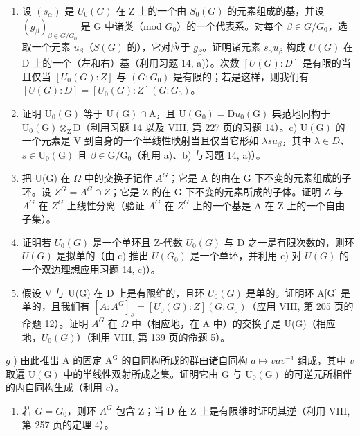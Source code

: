 \begin{enumerate}
\def\labelenumi{\alph{enumi})}
\item
  设 \((s_{\alpha})\) 是 \(U_{0}(G)\) 在 Z 上的一个由 \(S_{0}(G)\) 的元素组成的基，并设 \((g_{\beta})_{\beta\in G/G_{0}}\) 是 G 中诸类（mod \(G_{0}\)）的一个代表系。对每个 \(\beta\in G/G_{0}\)，选取一个元素 \(u_{\beta}\)（\(S(G)\) 的），它对应于 \(g_{\beta}\)。证明诸元素 \(s_{\alpha}u_{\beta}\) 构成 \(U(G)\) 在 D 上的一个（左和右）基（利用习题 14, a)）。次数 \([U(G):D]\) 是有限的当且仅当 \([U_{0}(G):Z]\) 与 \((G:G_{0})\) 是有限的；若是这样，则我们有 \([U(G):D]=[U_{0}(G):Z](G:G_{0})\)。
\item
  证明 \(\mathrm{U}_{0}(\mathrm{G})\) 等于 \(\mathrm{U}(\mathrm{G})\cap\mathrm{A}\)，且 \(\mathrm{U}(\mathrm{G}_{0})=\mathrm{D}u_{0}(\mathrm{G})\) 典范地同构于 \(\mathrm{U}_{0}(\mathrm{G})\otimes_{\mathrm{Z}}\mathrm{D}\)（利用习题 14 以及 VIII, 第 227 页的习题 14）。c) \(\mathrm{U}(\mathrm{G})\) 的一个元素是 V 到自身的一个半线性映射当且仅当它形如 \(\lambda su_{\beta}\)，其中 \(\lambda\in D\)、\(s\in\mathrm{U}_{0}(\mathrm{G})\) 且 \(\beta\in\mathrm{G}/\mathrm{G}_{0}\)（利用 a)、b) 与习题 14, a)）。
\item
  把 U(G) 在 \(\Omega\) 中的交换子记作 \(A^{G}\)；它是 A 的由在 G 下不变的元素组成的子环。设 \(Z^{G} = A^{G} \cap Z\)；它是 Z 的在 G 下不变的元素所成的子体。证明 Z 与 \(A^{G}\) 在 \(Z^{G}\) 上线性分离（验证 \(A^{G}\) 在 \(Z^{G}\) 上的一个基是 A 在 Z 上的一个自由子集）。
\item
  证明若 \(U_{0}(G)\) 是一个单环且 Z-代数 \(U_{0}(G)\) 与 D 之一是有限次数的，则环 \(U(G)\) 是拟单的（由 c) 推出 \(U(G_{0})\) 是一个单环，并利用 c) 对 \(U(G)\) 的一个双边理想应用习题 14, c)）。
\item
  假设 V 与 U(G) 在 D 上是有限维的，且环 \(U_{0}(G)\) 是单的。证明环 A{[}G{]} 是单的，且我们有 \([A : A^{G}]_{s} = [U_{0}(G) : Z](G : G_{0})\)（应用 VIII, 第 205 页的命题 12）。证明 \(A^{G}\) 在 \(\Omega\) 中（相应地，在 A 中）的交换子是 U(G)（相应地，\(U_{0}(G)\)）（利用 VIII, 第 139 页的命题 5）。
\end{enumerate}

\(g\) ) 由此推出 A 的固定 \(\mathrm{A}^{\mathrm{G}}\) 的自同构所成的群由诸自同构 \(a\mapsto vav^{-1}\) 组成，其中 \(v\) 取遍 \(\mathrm{U(G)}\) 中的半线性双射所成之集。证明它由 G 与 \(\mathrm{U_0(G)}\) 的可逆元所相伴的内自同构生成（利用 \(c\)）。

\begin{enumerate}
\def\labelenumi{\alph{enumi})}
\setcounter{enumi}{7}
\tightlist
\item
  若 \(G = G_{0}\)，则环 \(A^{G}\) 包含 Z；当 D 在 Z 上是有限维时证明其逆（利用 VIII, 第 257 页的定理 4）。
\end{enumerate}

